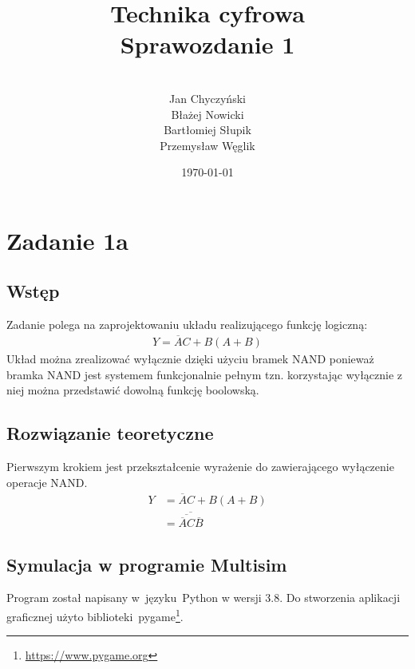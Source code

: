 \documentclass[12pt,a4paper,openright]{mwrep}
\begin{document}
\title{%
Technika cyfrowa\\
Sprawozdanie 1\\
}

\author{\\Jan Chyczyński\\Błażej Nowicki
\\Bartłomiej Słupik\\Przemysław Węglik}

\date{\today}

\maketitle

\chapter{Zadanie 1a}

\section{Wstęp}
Zadanie polega na zaprojektowaniu układu realizującego 
funkcję logiczną:
\begin{align*}
    Y = \overline{A}C + B(A + B)
\end{align*}
Układ można zrealizować wyłącznie dzięki użyciu bramek NAND
ponieważ bramka NAND jest systemem funkcjonalnie pełnym tzn.
korzystając wyłącznie z niej można przedstawić dowolną funkcję
boolowską.



\section{Rozwiązanie teoretyczne}
Pierwszym krokiem jest przekształcenie wyrażenie do zawierającego
wyłączenie operacje NAND.
\begin{align*}
    Y &= \overline{A}C + B(A + B) \\
    &= \overline{\overline{\overline{A}C}\overline{B}}
\end{align*}

\section{Symulacja w programie Multisim}
Program został napisany w~języku~Python w wersji 3.8.
Do stworzenia aplikacji graficznej użyto
biblioteki~pygame\footnote{\url{https://www.pygame.org}}.
\end{document}
